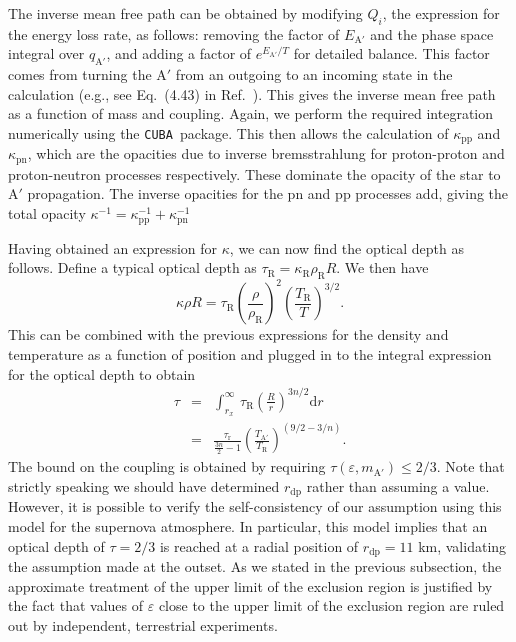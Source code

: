 \documentclass[nofootinbib,prd,superscriptaddress,twocolumn]{revtex4}
\newcommand{\beq}{\begin{equation}}
\newcommand{\eeq}{\end{equation}}
\newcommand{\bea}{\begin{eqnarray}}
\newcommand{\eea}{\end{eqnarray}}
\newcommand{\qa}{q_{\mathrm{A}'}}
\newcommand{\dd}{\mathrm{d}}
\begin{document}
The inverse mean free path can be obtained by modifying $ Q_i $, 
the expression for the energy loss rate, as follows: removing the factor of $ E_\mathrm{A'} $ 
and the phase space integral over $ \qa $, and adding a factor of $ e^{E_\mathrm{A'}/T} $ for detailed balance. This factor comes from turning the $\mathrm{A'}$ from an outgoing to an incoming state in the calculation (e.g., see Eq.~(4.43) in Ref.~\cite{raffelt96_book}).
This gives the inverse mean free path as a function of mass and coupling. 
Again, we perform the required integration numerically using the {\tt CUBA }package. 
This then allows the calculation of $\kappa_{\mathrm{pp}}$ and $\kappa_{\mathrm{pn}}$, 
which are the opacities due to inverse bremsstrahlung for proton-proton and proton-neutron 
processes respectively. These dominate the opacity of the star to $\mathrm{A'}$ propagation. 
The inverse opacities for the $\mathrm{pn}$ and $\mathrm{pp}$ processes add, 
giving the total opacity $ \kappa^{-1} = \kappa_{\mathrm{pp}}^{-1} + \kappa_{\mathrm{pn}}^{-1} $


Having obtained an expression for $ \kappa $, we can now find the optical depth as follows. 
Define a typical optical depth as $\tau_\mathrm{R} = \kappa_\mathrm{R} \rho_\mathrm{R} R $. We then have 
\beq 
\kappa \rho R = \tau_\mathrm{R} \left( \frac{\rho}{\rho_\mathrm{R}} \right)^2 \left( \frac{T_\mathrm{R}}{T} \right)^{3/2}.
\eeq
%
This can be combined with the previous expressions for the density and temperature as a function of position 
and plugged in to the integral expression for the optical depth to obtain 
\bea 
\tau &=& \int_{r_x}^{\infty}\, \tau_\mathrm{R} \left( \frac{R}{r} \right)^{3n/2} \dd r \\
 &=& \frac{\tau_\mathrm{r}}{\frac{3n}{2}-1} \left( \frac{T_\mathrm{A'}}{T_\mathrm{R}} \right)^{(9/2-3/n)}. 
 \eea
 The bound on the coupling is obtained by requiring  $ \tau(\varepsilon,m_\mathrm{A'}) \le 2/3 $. Note that strictly speaking we should have determined $ r_{\mathrm{dp}}$ rather than assuming a value. However, it is possible to verify the self-consistency of our assumption using this model for the supernova atmosphere. In particular, this model implies that an optical depth of $\tau=2/3$ is reached at a radial position of $ r_{\mathrm{dp}}= 11$ km,  validating the assumption made at the outset. As we stated in the previous subsection, the approximate treatment of the upper limit of the exclusion region is justified by the fact that values of $\varepsilon$ close to the upper limit of the exclusion region are ruled out by independent, terrestrial experiments.
\end{document}

